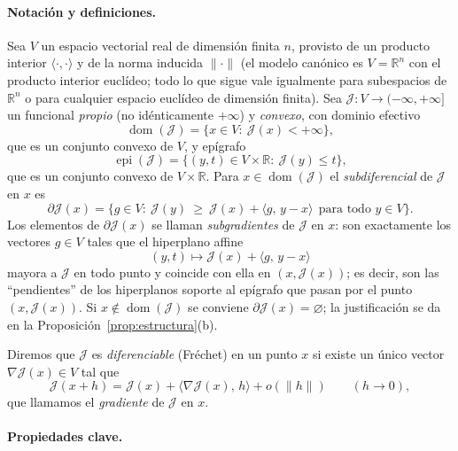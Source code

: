 \documentclass[12pt]{book}
\theoremstyle{definition}
\theoremstyle{plain}
\theoremstyle{remark}
\begin{document}
\paragraph{Notaci\'on y definiciones.}
Sea $V$ un espacio vectorial real de dimensi\'on finita $n$, provisto de
un producto interior $\langle\cdot,\cdot\rangle$ y de la norma inducida
$\|\cdot\|$ (el modelo can\'onico es $V=\mathbb{R}^{n}$ con el producto
interior eucl\'ideo; todo lo que sigue vale igualmente para subespacios
de $\mathbb{R}^{n}$ o para cualquier espacio eucl\'ideo de dimensi\'on
finita). Sea $\mathcal{J}\colon V\to(-\infty,+\infty]$ un funcional
\emph{propio} (no id\'enticamente $+\infty$) y \emph{convexo}, con
dominio efectivo
\[
\operatorname{dom}(\mathcal{J})
=\{x\in V:\ \mathcal{J}(x)<+\infty\},
\]
que es un conjunto convexo de $V$, y ep\'igrafo
\[
\operatorname{epi}(\mathcal{J})
=\{(y,t)\in V\times\mathbb{R}:\ \mathcal{J}(y)\le t\},
\]
que es un conjunto convexo de $V\times\mathbb{R}$. Para
$x\in\operatorname{dom}(\mathcal{J})$ el \emph{subdiferencial} de
$\mathcal{J}$ en $x$ es
\[
\partial\mathcal{J}(x)
=\bigl\{g\in V:\ \mathcal{J}(y)\ \ge\
\mathcal{J}(x)+\langle g,\,y-x\rangle
\ \ \text{para todo } y\in V\bigr\}.
\]
Los elementos de $\partial\mathcal{J}(x)$ se llaman \emph{subgradientes}
de $\mathcal{J}$ en $x$: son exactamente los vectores $g\in V$ tales que
el hiperplano affine
\[
(y,t)\mapsto \mathcal{J}(x)+\langle g,\,y-x\rangle
\]
mayora a $\mathcal{J}$ en todo punto y coincide con ella en
$(x,\mathcal{J}(x))$; es decir, son las ``pendientes'' de los
hiperplanos soporte al ep\'igrafo que pasan por el punto
$(x,\mathcal{J}(x))$. Si $x\notin\operatorname{dom}(\mathcal{J})$ se
conviene $\partial\mathcal{J}(x)=\varnothing$; la justificaci\'on se da
en la Proposici\'on~\ref{prop:estructura}(b).

Diremos que $\mathcal{J}$ es \emph{diferenciable} (Fr\'echet) en un punto
$x$ si existe un \'unico vector $\nabla\mathcal{J}(x)\in V$ tal que
\[
\mathcal{J}(x+h)=\mathcal{J}(x)
+\langle\nabla\mathcal{J}(x),\,h\rangle
+o(\|h\|)\qquad(h\to 0),
\]
que llamamos el \emph{gradiente} de $\mathcal{J}$ en $x$.

\paragraph{Propiedades clave.}
\end{document}
